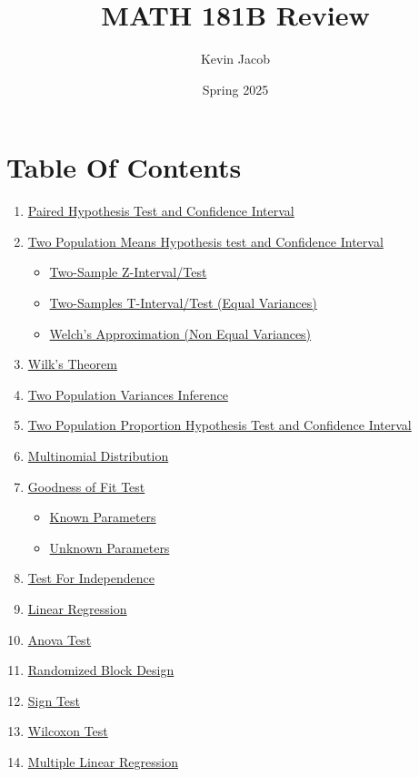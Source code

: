 \documentclass{article}
\title{MATH 181B Review}
\author{Kevin Jacob}
\date{Spring 2025}
\begin{document}
\maketitle
\newpage
\section*{Table Of Contents}
\begin{enumerate}
    \item \hyperref[sec:pair]{Paired Hypothesis Test and Confidence Interval}
    \item \hyperref[sec:twoP]{Two Population Means Hypothesis test and Confidence Interval}
    \begin{itemize}
        \item \hyperref[sec:equalVZ]{Two-Sample Z-Interval/Test}
        \item \hyperref[sec:equalVT]{Two-Samples T-Interval/Test (Equal Variances)}
        \item \hyperref[sec:notEqualV]{Welch's Approximation (Non Equal Variances)}
    \end{itemize}
    \item \hyperref[sec:wilk]{Wilk's Theorem}
    \item \hyperref[sec:twoPVar]{Two Population Variances Inference}
    \item \hyperref[sec:twoPProp]{Two Population Proportion Hypothesis Test and Confidence Interval}
    \item \hyperref[sec:multinom]{Multinomial Distribution}
    \item \hyperref[sec:goodness]{Goodness of Fit Test}
    \begin{itemize}
        \item \hyperref[sec:goodKnown]{Known Parameters}
        \item \hyperref[sec:goodUnknown]{Unknown Parameters}
    \end{itemize}
    \item \hyperref[sec:independence]{Test For Independence}
    \item \hyperref[sec:linear]{Linear Regression}
    \item \hyperref[sec:anova]{Anova Test}
    \item \hyperref[sec:rbd]{Randomized Block Design}
    \item \hyperref[sec:sign]{Sign Test}
    \item \hyperref[sec:wilcoxon]{Wilcoxon Test}
    \item \hyperref[sec:multiLinear]{Multiple Linear Regression}
\end{enumerate}
\newpage
\end{document}
